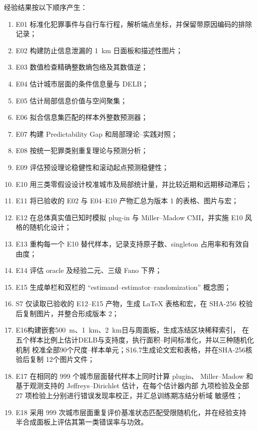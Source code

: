 经验结果按以下顺序产生：
\begin{enumerate}[label=\arabic*.,leftmargin=2.4em]
    \item E01 标准化犯罪事件与自行车行程，解析端点坐标，并保留带原因编码的排除记录；
    \item E02 构建防止信息泄漏的 1~km 日面板和描述性图片；
    \item E03 数值检查精确整数熵包络及其数值逆；
    \item E04 估计城市层面的条件信息量与 DELB；
    \item E05 估计局部信息价值与空间聚集；
    \item E06 拟合信息集匹配的样本外整数预测器；
    \item E07 构建 Predictability Gap 和局部理论--实践对照；
    \item E08 按统一犯罪类别重复理论与预测分析；
    \item E09 评估预设理论稳健性和滚动起点预测稳健性；
    \item E10 用三类零假设设计校准城市及局部统计量，并比较近期和远期移动滞后；
    \item E11 将已验收的 E02 与 E04--E10 产物汇总为版本 1 的表格、图片与宏；
    \item E12 在总体真实值已知时模拟 plug-in 与 Miller--Madow CMI，并实施 E10 风格的随机化设计；
    \item E13 重构每一个 E10 替代样本，记录支持原子数、singleton 占用率和有效自由度；
    \item E14 评估 oracle 及经验二元、三级 Fano 下界；
    \item E15 生成单栏和双栏的 ``estimand--estimator--randomization'' 概念图；
    \item S7 仅读取已验收的 E12--E15 产物，生成 LaTeX 表格和宏，在 SHA-256
    校验后复制图片，并整合形成版本 2；
    \item E16构建嵌套500~m、1~km、2~km日与周面板，生成冻结区块稀释索引，
    在五个样本比例上估计DELB与支持度，执行面积--时间标准化，并以三种随机化机制
    校准全部90个尺度--样本单元；S16.7生成论文宏和表格，并在SHA-256核验后复制
    12个图片文件；
    \item E17 在相同的 999 个城市层面替代样本上同时计算 plugin、
    Miller--Madow 和基于观测支持的 Jeffreys--Dirichlet 估计，在每个估计器内部
    九项检验及全部 27 项检验上分别进行错误发现率校正，并汇总训练期冻结分析域
    敏感性；
    \item E18 采用 999 次城市层面重复评价基准状态匹配受限随机化，并在经验支持
    半合成面板上评估其第一类错误率与功效。
\end{enumerate}

